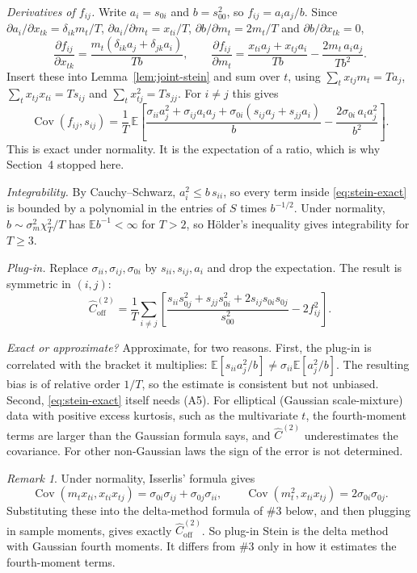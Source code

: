 \documentclass[11pt]{article}
\theoremstyle{remark}
\newtheorem*{remark}{Remark}
\begin{document}
\emph{Derivatives of $f_{ij}$.} Write $a_i = s_{0i}$ and $b = s_{00}^2$, so $f_{ij} = a_ia_j/b$. Since $\partial a_i/\partial x_{tk} = \delta_{ik}m_t/T$, $\partial a_i/\partial m_t = x_{ti}/T$, $\partial b/\partial m_t = 2m_t/T$ and $\partial b/\partial x_{tk} = 0$,
\[
  \frac{\partial f_{ij}}{\partial x_{tk}} = \frac{m_t(\delta_{ik}a_j + \delta_{jk}a_i)}{Tb}, \qquad
  \frac{\partial f_{ij}}{\partial m_t} = \frac{x_{ti}a_j + x_{tj}a_i}{Tb} - \frac{2m_t\,a_ia_j}{Tb^2}.
\]
Insert these into Lemma~\ref{lem:joint-stein} and sum over $t$, using $\sum_t x_{tj}m_t = Ta_j$, $\sum_t x_{tj}x_{ti} = Ts_{ij}$ and $\sum_t x_{tj}^2 = Ts_{jj}$. For $i \ne j$ this gives
\begin{equation}\label{eq:stein-exact}
  \operatorname{Cov}(f_{ij}, s_{ij}) = \frac{1}{T}\,\mathbb{E}\left[\frac{\sigma_{ii}a_j^2 + \sigma_{ij}a_ia_j + \sigma_{0i}(s_{ij}a_j + s_{jj}a_i)}{b} - \frac{2\sigma_{0i}\,a_ia_j^2}{b^2}\right].
\end{equation}
This is exact under normality. It is the expectation of a ratio, which is why Section~4 stopped here.

\emph{Integrability.} By Cauchy--Schwarz, $a_i^2 \le b\,s_{ii}$, so every term inside \eqref{eq:stein-exact} is bounded by a polynomial in the entries of $S$ times $b^{-1/2}$. Under normality, $b \sim \sigma_m^2\chi^2_T/T$ has $\mathbb{E}b^{-1} < \infty$ for $T > 2$, so Hölder's inequality gives integrability for $T \ge 3$.

\emph{Plug-in.} Replace $\sigma_{ii}, \sigma_{ij}, \sigma_{0i}$ by $s_{ii}, s_{ij}, a_i$ and drop the expectation. The result is symmetric in $(i,j)$:
\[
  \hat C_{\mathrm{off}}^{(2)} = \frac{1}{T}\sum_{i \ne j}\left[\frac{s_{ii}s_{0j}^2 + s_{jj}s_{0i}^2 + 2s_{ij}s_{0i}s_{0j}}{s_{00}^2} - 2f_{ij}^2\right].
\]

\emph{Exact or approximate?} Approximate, for two reasons. First, the plug-in is correlated with the bracket it multiplies: $\mathbb{E}[s_{ii}a_j^2/b] \ne \sigma_{ii}\mathbb{E}[a_j^2/b]$. The resulting bias is of relative order $1/T$, so the estimate is consistent but not unbiased. Second, \eqref{eq:stein-exact} itself needs (A5). For elliptical (Gaussian scale-mixture) data with positive excess kurtosis, such as the multivariate $t$, the fourth-moment terms are larger than the Gaussian formula says, and $\hat C^{(2)}$ underestimates the covariance. For other non-Gaussian laws the sign of the error is not determined.

\begin{remark}
Under normality, Isserlis' formula gives
\[
  \operatorname{Cov}(m_tx_{ti}, x_{ti}x_{tj}) = \sigma_{0i}\sigma_{ij} + \sigma_{0j}\sigma_{ii}, \qquad \operatorname{Cov}(m_t^2, x_{ti}x_{tj}) = 2\sigma_{0i}\sigma_{0j}.
\]
Substituting these into the delta-method formula of \#3 below, and then plugging in sample moments, gives exactly $\hat C^{(2)}_{\mathrm{off}}$. So plug-in Stein is the delta method with Gaussian fourth moments. It differs from \#3 only in how it estimates the fourth-moment terms.
\end{remark}
\end{document}
